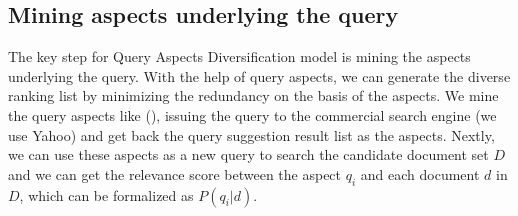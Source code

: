 \documentclass[review]{elsarticle}
\begin{document}
%
%
%
\subsection{Mining aspects underlying the query}\label{mine_aspect}
The key step for Query Aspects Diversification model is mining the aspects underlying the query. With the help of query aspects, we can generate the diverse ranking list by minimizing the redundancy on the basis of the aspects. We mine the query aspects like (\cite{santos2010exploiting}), issuing the query to the commercial search engine (we use Yahoo) and get back the query suggestion result list as the aspects. Nextly, we can use these aspects as a new query to search the candidate document set $D$ and we can get the relevance score between the aspect $q_i$ and each document $d$ in $D$, which can be formalized as $P(q_i|d)$.
\end{document}

